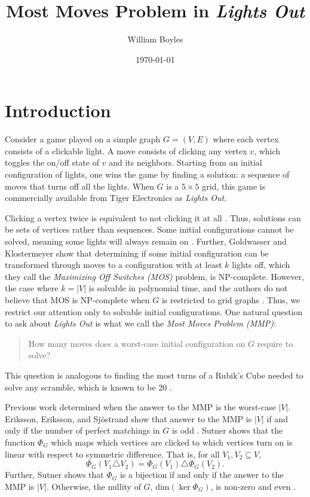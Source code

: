 \documentclass[a4paper]{article}
\newcommand{\abs}[1]{\left| #1 \right|}
\renewcommand{\dim}[1]{\text{dim}\left( #1 \right)}
\begin{document}
	\title{Most Moves Problem in \textit{Lights Out}}
	\author{William Boyles}
	\date{\today}
	\maketitle
	
	\section{Introduction}
	Consider a game played on a simple graph $G=(V,E)$ where each vertex consists of a clickable light.
	A move consists of clicking any vertex $v$, which toggles the on/off state of $v$ and its neighbors.
	Starting from an initial configuration of lights, one wins the game by finding a solution: a sequence of moves that turns off all the lights.
	When $G$ is a $5 \times 5$ grid, this game is commercially available from Tiger Electronics as \textit{Lights Out}.
	
	Clicking a vertex twice is equivalent to not clicking it at all \cite{Sutner1989}.
	Thus, solutions can be sets of vertices rather than sequences.
	Some initial configurations cannot be solved, meaning some lights will always remain on \cite{anderson_feil}.
	Further, Goldwasser and Klostermeyer show that determining if some initial configuration can be transformed through moves to a configuration with at least $k$ lights off, which they call the \textit{Maximizing Off Switches (MOS)} problem, is NP-complete.
	However, the case where $k=\abs{V}$ is solvable in polynomial time, and the authors do not believe that MOS is NP-complete when $G$ is restricted to grid graphs \cite{Goldwasser2000}.
	Thus, we restrict our attention only to solvable initial configurations.
	One natural question to ask about \textit{Lights Out} is what we call the \textit{Most Moves Problem (MMP)}:
	\begin{quote}
		How many moves does a worst-case initial configuration on $G$ require to solve?
	\end{quote}
	This question is analogous to finding the most turns of a Rubik's Cube needed to solve any scramble, which is known to be 20 \cite{Rockiki2013}. 
	
	Previous work determined when the answer to the MMP is the worst-case $\abs{V}$.
	Eriksson, Eriksson, and Sjöstrand show that answer to the MMP is $\abs{V}$ if and only if the number of perfect matchings in $G$ is odd \cite{ERIKSSON2001357}.
	Sutner shows that the function $\Phi_G$ which maps which vertices are clicked to which vertices turn on is linear with respect to symmetric difference.
	That is, for all $V_1, V_2 \subseteq V$,
	\begin{equation*}
		\Phi_G(V_1 \triangle V_2) = \Phi_G(V_1) \triangle \Phi_G(V_2).
	\end{equation*}
	Further, Sutner shows that $\Phi_G$ is a bijection if and only if the answer to the MMP is $\abs{V}$.
	Otherwise, the nullity of $G$, $\dim{\ker{\Phi_G}}$, is non-zero and even \cite{Sutner1989}.
	
\end{document}
